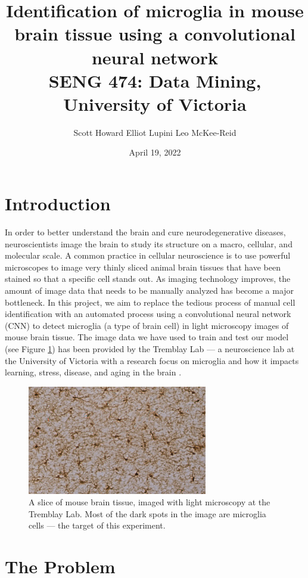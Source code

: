 \documentclass{article}
\title{Identification of microglia in mouse brain tissue using a convolutional 
neural network \\
\large SENG 474: Data Mining, University of Victoria \\
}
\author{
    Scott Howard
    \And
    Elliot Lupini
    \And
    Leo McKee-Reid
}
\date{April 19, 2022}
\begin{document}
\maketitle

\section{Introduction}

In order to better understand the brain and cure neurodegenerative diseases, 
neuroscientists image the brain to study its structure on a macro, cellular, 
and molecular scale. A common practice in cellular neuroscience is to use 
powerful microscopes to image very thinly sliced animal brain tissues that 
have been stained so that a specific cell stands out. As imaging technology 
improves, the amount of image data that needs to be manually analyzed has 
become a major bottleneck. In this project, we aim to replace the tedious 
process of manual cell identification with an automated process using a 
convolutional neural network (CNN) to detect microglia (a type of brain cell) 
in light microscopy images of mouse brain tissue. The image data we have used 
to train and test our model (see Figure \ref{fig:hippocampus}) has been 
provided by the Tremblay Lab --- a neuroscience lab at the University of 
Victoria with a research focus on microglia and how it impacts learning, 
stress, disease, and aging in the brain \parencite{tremblay}.

\begin{figure}[ht]
  \includegraphics[width=0.7\textwidth]{hippocampus.png}
  \centering
  \captionsetup{width=0.7\textwidth}
  \caption{A slice of mouse brain tissue, imaged with light microscopy at the 
  Tremblay Lab. Most of the dark spots in the image are microglia cells --- the 
  target of this experiment.}
  \label{fig:hippocampus}
\end{figure}

\section{The Problem}
\end{document}
